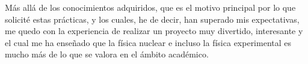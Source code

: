 \documentclass[12pt,a4paper]{article}
\numberwithin{equation}{section}
\numberwithin{figure}{section}
\begin{document}
Más allá de los conocimientos adquiridos, que es el motivo principal por lo que solicité estas prácticas, y los cuales, he de decir, han superado mis expectativas, me quedo con la experiencia de realizar un proyecto muy divertido, interesante y el cual me ha enseñado que la física nuclear e incluso la física experimental es mucho más de lo que se valora en el ámbito académico.
\end{document}
